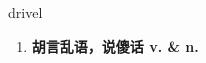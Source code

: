 
\begin{frame}
{\huge drivel}
\begin{center}
\begin{enumerate}\Large
  \item \textbf{胡言乱语，说傻话 v. \& n.}
\end{enumerate}
\end{center}
\end{frame}
